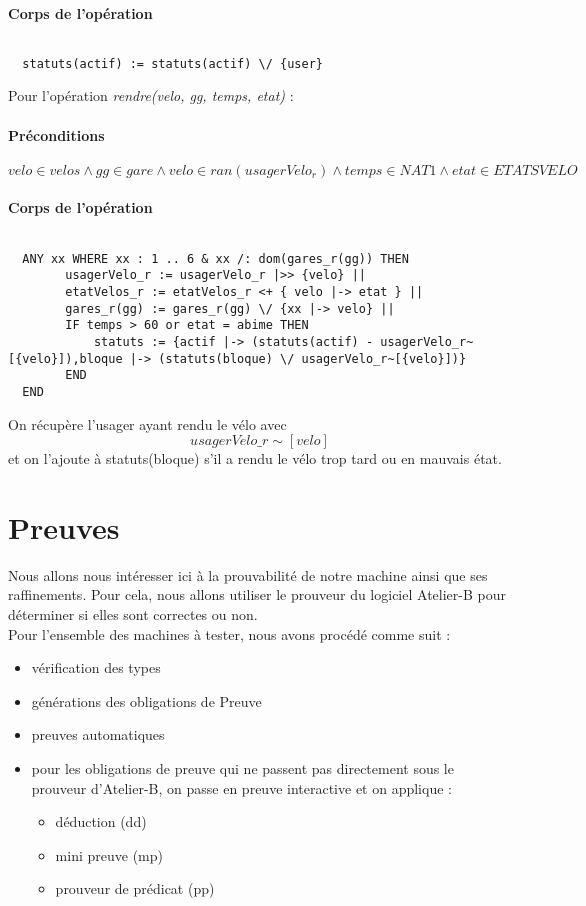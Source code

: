 \documentclass[12pt]{article}
\begin{document}
\paragraph{Corps de l'opération}
\[\]
\begin{lstlisting}
  statuts(actif) := statuts(actif) \/ {user}
\end{lstlisting}
\newpage
Pour l'opération \textit{rendre(velo, gg, temps, etat)} :
\paragraph{Préconditions}
\[ velo \in velos \land gg \in gare \land velo \in ran(usagerVelo_r) \land temps \in NAT1 \land etat \in ETATSVELO\]
\paragraph{Corps de l'opération}
\[\]
\begin{lstlisting}
  ANY xx WHERE xx : 1 .. 6 & xx /: dom(gares_r(gg)) THEN
        usagerVelo_r := usagerVelo_r |>> {velo} ||
        etatVelos_r := etatVelos_r <+ { velo |-> etat } ||
        gares_r(gg) := gares_r(gg) \/ {xx |-> velo} ||
        IF temps > 60 or etat = abime THEN
            statuts := {actif |-> (statuts(actif) - usagerVelo_r~[{velo}]),bloque |-> (statuts(bloque) \/ usagerVelo_r~[{velo}])}
        END
  END
\end{lstlisting}
On récupère l'usager ayant rendu le vélo avec \[usagerVelo\_r\sim[{velo}]\] et on l'ajoute à statuts(bloque) s'il a rendu le vélo trop tard ou en mauvais état.
\newpage
\section{Preuves}
Nous allons nous intéresser ici à la prouvabilité de notre machine ainsi que ses raffinements. Pour cela, nous allons utiliser le prouveur du logiciel Atelier-B pour déterminer si elles sont correctes ou non.\\

Pour l'ensemble des machines à tester, nous avons procédé comme suit :
\begin{itemize}
  \item vérification des types
  \item générations des obligations de Preuve
  \item preuves automatiques
  \item pour les obligations de preuve qui ne passent pas directement sous le prouveur d'Atelier-B, on passe en preuve interactive et on applique :
  \begin{itemize}
    \item déduction (dd)
    \item mini preuve (mp)
    \item prouveur de prédicat (pp)
  \end{itemize}
\end{itemize}
\end{document}
